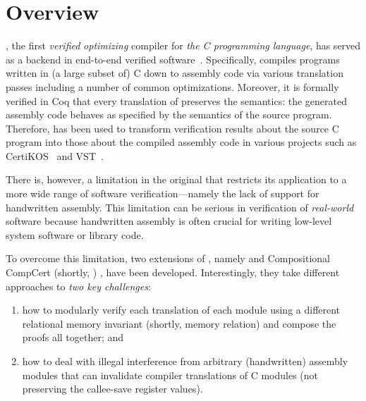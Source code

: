 \chapter{\;\;\;\;Overview}\label{sec:overview}


\cc{} \cite{CompCert, Compcert-CACM}, the first \emph{verified}
\emph{optimizing} compiler for \emph{the C programming language}, has
served as a backend in end-to-end verified
software~\cite{appel2014program}. Specifically, \cc{} compiles programs written in (a
large subset of) C down to assembly code via various translation
passes including a number of common optimizations.  Moreover, it is
formally verified in Coq that every translation of \cc{} preserves the
semantics: the generated assembly code behaves as specified by the
semantics of the source program. Therefore, \cc{} has been used to
transform verification results about the source C program into those
about the compiled assembly code in various projects such as
CertiKOS~\cite{CertiKOS11, CertiKOS16} and VST~\cite{VST}.

There is, however, a limitation in the original \cc{} that restricts
its application to a more wide range of software verification---namely
the lack of support for handwritten assembly. This
limitation can be serious in verification of \emph{real-world}
software because handwritten assembly is often crucial for writing
low-level system software or library code.

To overcome this limitation, two extensions of \cc{}, namely \ccx{}
\cite{gu:dscal,wang:saccx} and Compositional CompCert (shortly, \ccc{}) \cite{beringer:isem,stewart:ccc}, have
been developed. Interestingly, they take different approaches to
\emph{two key challenges}:
\begin{enumerate}
\item how to modularly verify each translation of each
module using a different relational memory invariant (shortly, memory relation) and compose the proofs all
together; and
\item how to deal with illegal interference from
arbitrary (handwritten) assembly modules that can invalidate compiler
translations of C modules (\eg not preserving the
callee-save register values).
\end{enumerate}

